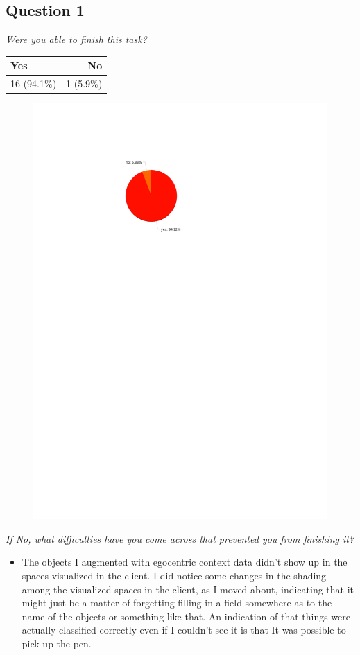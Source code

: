 \subsection{Question 1}\label{question2:1}
\emph{Were you able to finish this task?}
\begin{table}[H]
	\begin{center}
		\small \begin{tabular*}{0.35\columnwidth}{lr}
			\\ \hline \hline
			Yes & No \\ \hline \hline

		 	16 (94.1\%) & 1 (5.9\%)\\ \hline
		\end{tabular*}
	\end{center}
\end{table}

\begin{figure}[H]
	\centering
	\includegraphics[width=0.5\linewidth]{gfx/Chapter_EvaluationResults/ChildproofTask/question1}
\end{figure}

\emph{If No, what difficulties have you come across that prevented you from finishing it?}
\begin{itemize}
	\item The objects I augmented with egocentric context data didn't show up in the spaces visualized in the client. I did notice some changes in the shading among the visualized spaces in the client, as I moved about, indicating that it might just be a matter of forgetting filling in a field somewhere as to the name of the objects or something like that. An indication of that things were actually classified correctly even if I couldn't see it is that It was possible to pick up the pen.
\end{itemize}

